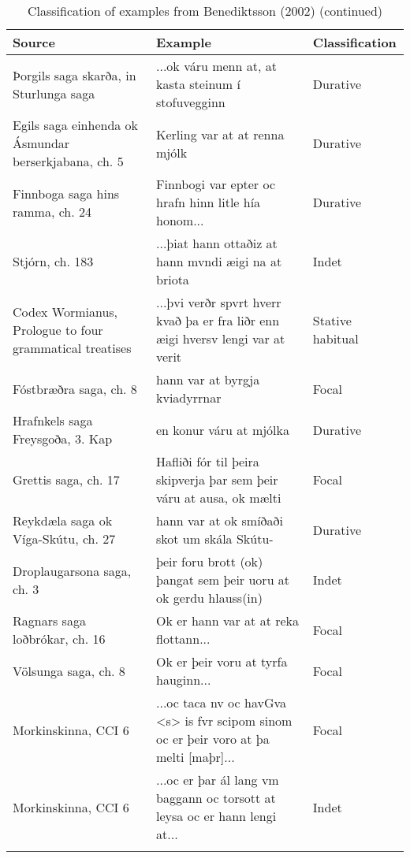 \documentclass[output=paper,colorlinks,citecolor=brown]{langscibook}
\begin{document}
\begin{paperappendix}
\begin{table}
\small
\caption{Classification of examples from Benediktsson (2002) (continued)}
\begin{tabularx}{\textwidth}{>{\raggedright\arraybackslash}p{3cm} >{\raggedright\arraybackslash}p{6cm} l}
\lsptoprule
Source & Example & Classification \\
\midrule
Þorgils saga skarða, in Sturlunga saga & ...ok váru menn at, at kasta steinum í stofuvegginn & Durative \\
Egils saga einhenda ok Ásmundar berserkjabana, ch. 5 & Kerling var at at renna mjólk & Durative \\
Finnboga saga hins ramma, ch. 24 & Finnbogi var epter oc hrafn hinn litle hía honom... & Durative \\
Stjórn, ch. 183 & ...þiat hann ottaðiz at hann mvndi æigi na at briota & Indet \\
Codex Wormianus, Prologue to four grammatical treatises & ...þvi verðr spvrt hverr kvað þa er fra liðr enn æigi hversv lengi var at verit & Stative habitual \\
Fóstbræðra saga, ch. 8 & hann var at byrgja kviadyrrnar & Focal \\
Hrafnkels saga Freysgoða, 3. Kap & en konur váru at mjólka & Durative \\
Grettis saga, ch. 17 & Hafliði fór til þeira skipverja þar sem þeir váru at ausa, ok mælti & Focal \\
Reykdæla saga ok Víga-Skútu, ch. 27 & hann var at ok smíðaði skot um skála Skútu- & Durative \\
Droplaugarsona saga, ch. 3 & þeir foru brott (ok) þangat sem þeir uoru at ok gerdu hlauss(in) & Indet \\
Ragnars saga loðbrókar, ch. 16 & Ok er hann var at at reka flottann... & Focal \\
Völsunga saga, ch. 8 & Ok er þeir voru at tyrfa hauginn... & Focal \\
Morkinskinna, CCI 6 & ...oc taca nv oc havGva <s> is fvr scipom sinom oc er þeir voro at þa melti [maþr]... & Focal \\
Morkinskinna, CCI 6 & ...oc er þar ál lang vm baggann oc torsott at leysa oc er hann lengi at... & Indet \\
\lspbottomrule
\end{tabularx}
\end{table}



\end{paperappendix}
\end{document}
